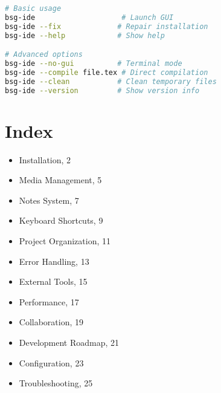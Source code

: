 \documentclass[11pt,a4paper]{article}
\begin{document}
\begin{tcolorbox}[title=CLI Commands]
\begin{lstlisting}[language=bash]
# Basic usage
bsg-ide                    # Launch GUI
bsg-ide --fix             # Repair installation
bsg-ide --help            # Show help

# Advanced options
bsg-ide --no-gui          # Terminal mode
bsg-ide --compile file.tex # Direct compilation
bsg-ide --clean           # Clean temporary files
bsg-ide --version         # Show version info
\end{lstlisting}
\end{tcolorbox}

\section{Index}

\begin{multicols}{2}
\begin{itemize}
    \item Installation, 2
    \item Media Management, 5
    \item Notes System, 7
    \item Keyboard Shortcuts, 9
    \item Project Organization, 11
    \item Error Handling, 13
    \item External Tools, 15
    \item Performance, 17
    \item Collaboration, 19
    \item Development Roadmap, 21
    \item Configuration, 23
    \item Troubleshooting, 25
\end{itemize}
\end{multicols}
\end{document}
